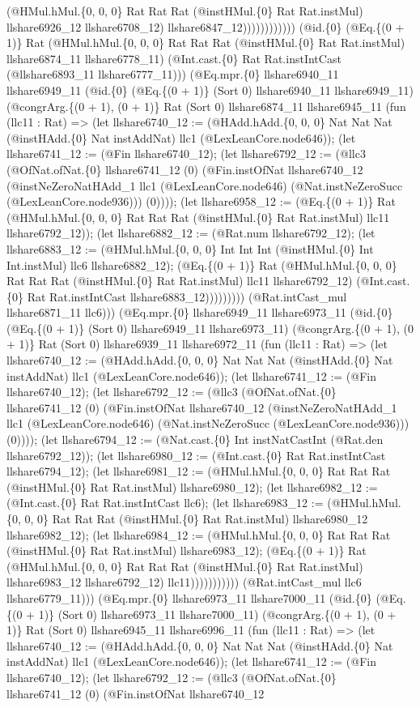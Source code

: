 \documentclass[11pt]{article}
\begin{document}
(@HMul.hMul.\{0, 0, 0\} Rat Rat Rat (@instHMul.\{0\} Rat Rat.instMul) llshare6926\_12 llshare6708\_12) llshare6847\_12)))))))))))) (@id.\{0\} (@Eq.\{(0 + 1)\} Rat (@HMul.hMul.\{0, 0, 0\} Rat Rat Rat (@instHMul.\{0\} Rat Rat.instMul) llshare6874\_11 llshare6778\_11) (@Int.cast.\{0\} Rat Rat.instIntCast (@llshare6893\_11 llshare6777\_11))) (@Eq.mpr.\{0\} llshare6940\_11 llshare6949\_11 (@id.\{0\} (@Eq.\{(0 + 1)\} (Sort 0) llshare6940\_11 llshare6949\_11) (@congrArg.\{(0 + 1), (0 + 1)\} Rat (Sort 0) llshare6874\_11 llshare6945\_11 (fun (llc11 : Rat) => (let llshare6740\_12 := (@HAdd.hAdd.\{0, 0, 0\} Nat Nat Nat (@instHAdd.\{0\} Nat instAddNat) llc1 (@LexLeanCore.node646)); (let llshare6741\_12 := (@Fin llshare6740\_12); (let llshare6792\_12 := (@llc3 (@OfNat.ofNat.\{0\} llshare6741\_12 (0) (@Fin.instOfNat llshare6740\_12 (@instNeZeroNatHAdd\_1 llc1 (@LexLeanCore.node646) (@Nat.instNeZeroSucc (@LexLeanCore.node936))) (0)))); (let llshare6958\_12 := (@Eq.\{(0 + 1)\} Rat (@HMul.hMul.\{0, 0, 0\} Rat Rat Rat (@instHMul.\{0\} Rat Rat.instMul) llc11 llshare6792\_12)); (let llshare6882\_12 := (@Rat.num llshare6792\_12); (let llshare6883\_12 := (@HMul.hMul.\{0, 0, 0\} Int Int Int (@instHMul.\{0\} Int Int.instMul) llc6 llshare6882\_12); (@Eq.\{(0 + 1)\} Rat (@HMul.hMul.\{0, 0, 0\} Rat Rat Rat (@instHMul.\{0\} Rat Rat.instMul) llc11 llshare6792\_12) (@Int.cast.\{0\} Rat Rat.instIntCast llshare6883\_12))))))))) (@Rat.intCast\_mul llshare6871\_11 llc6))) (@Eq.mpr.\{0\} llshare6949\_11 llshare6973\_11 (@id.\{0\} (@Eq.\{(0 + 1)\} (Sort 0) llshare6949\_11 llshare6973\_11) (@congrArg.\{(0 + 1), (0 + 1)\} Rat (Sort 0) llshare6939\_11 llshare6972\_11 (fun (llc11 : Rat) => (let llshare6740\_12 := (@HAdd.hAdd.\{0, 0, 0\} Nat Nat Nat (@instHAdd.\{0\} Nat instAddNat) llc1 (@LexLeanCore.node646)); (let llshare6741\_12 := (@Fin llshare6740\_12); (let llshare6792\_12 := (@llc3 (@OfNat.ofNat.\{0\} llshare6741\_12 (0) (@Fin.instOfNat llshare6740\_12 (@instNeZeroNatHAdd\_1 llc1 (@LexLeanCore.node646) (@Nat.instNeZeroSucc (@LexLeanCore.node936))) (0)))); (let llshare6794\_12 := (@Nat.cast.\{0\} Int instNatCastInt (@Rat.den llshare6792\_12)); (let llshare6980\_12 := (@Int.cast.\{0\} Rat Rat.instIntCast llshare6794\_12); (let llshare6981\_12 := (@HMul.hMul.\{0, 0, 0\} Rat Rat Rat (@instHMul.\{0\} Rat Rat.instMul) llshare6980\_12); (let llshare6982\_12 := (@Int.cast.\{0\} Rat Rat.instIntCast llc6); (let llshare6983\_12 := (@HMul.hMul.\{0, 0, 0\} Rat Rat Rat (@instHMul.\{0\} Rat Rat.instMul) llshare6980\_12 llshare6982\_12); (let llshare6984\_12 := (@HMul.hMul.\{0, 0, 0\} Rat Rat Rat (@instHMul.\{0\} Rat Rat.instMul) llshare6983\_12); (@Eq.\{(0 + 1)\} Rat (@HMul.hMul.\{0, 0, 0\} Rat Rat Rat (@instHMul.\{0\} Rat Rat.instMul) llshare6983\_12 llshare6792\_12) llc11))))))))))) (@Rat.intCast\_mul llc6 llshare6779\_11))) (@Eq.mpr.\{0\} llshare6973\_11 llshare7000\_11 (@id.\{0\} (@Eq.\{(0 + 1)\} (Sort 0) llshare6973\_11 llshare7000\_11) (@congrArg.\{(0 + 1), (0 + 1)\} Rat (Sort 0) llshare6945\_11 llshare6996\_11 (fun (llc11 : Rat) => (let llshare6740\_12 := (@HAdd.hAdd.\{0, 0, 0\} Nat Nat Nat (@instHAdd.\{0\} Nat instAddNat) llc1 (@LexLeanCore.node646)); (let llshare6741\_12 := (@Fin llshare6740\_12); (let llshare6792\_12 := (@llc3 (@OfNat.ofNat.\{0\} llshare6741\_12 (0) (@Fin.instOfNat llshare6740\_12 
\end{document}
